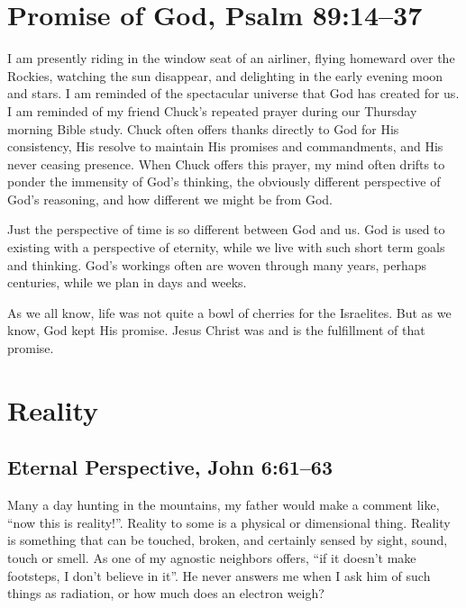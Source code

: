 \documentclass[12pt]{memoir}
\begin{document}
\section[Promise of God]{Promise of God, Psalm 89:14--37}

I am presently riding in the window seat of an airliner, flying homeward
over the Rockies, watching the sun disappear, and delighting in the
early evening moon and stars. I am reminded of the spectacular universe
that God has created for us. I am reminded of my friend Chuck's repeated
prayer during our Thursday morning Bible study. Chuck often offers
thanks directly to God for His consistency, His resolve to maintain His promises and commandments, and His never ceasing presence. When Chuck offers this prayer, my mind often drifts to ponder the immensity of God's thinking, the obviously different perspective of God's reasoning, and how different we might be from God. 

Just the perspective of time is so different between God and us. God
is used to existing with a perspective of eternity, while we live
with such short term goals and thinking. God's workings often are
woven through many years, perhaps centuries, while we plan in days
and weeks.

As we all know, life was not quite a bowl of cherries for the Israelites. But as we know, God kept His promise. Jesus Christ was
and is the fulfillment of that promise. 

\section{Reality}

\subsection[Eternal Perspective]{Eternal Perspective, John 6:61--63}

Many a day hunting in the mountains, my father would make a comment
like, ``now this is reality!''. Reality to some is a physical or
dimensional thing. Reality is something that can be touched, broken,
and certainly sensed by sight, sound, touch or smell. As one of my
agnostic neighbors offers, ``if it doesn't make footsteps, I don't believe in it''. He never answers me when I ask him of such things
as radiation, or how much does an electron weigh?
\end{document}
